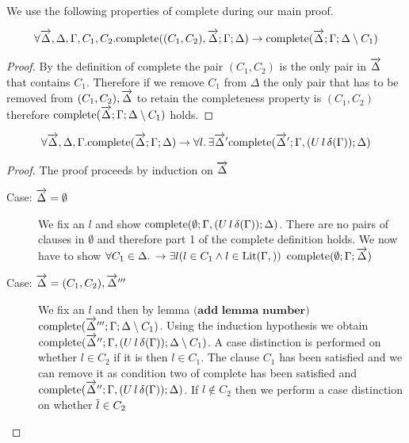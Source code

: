 We use the following properties of $\mathrm{complete}$ during our main proof.


\begin{mylemma}
\begin{align*}
\forall \overrightarrow{\Delta},\Delta,\Gamma,C_1,C_2. \mathrm{complete}((C_1, C_2), \overrightarrow{\Delta};\Gamma; \Delta) \to \mathrm{complete}(\overrightarrow{\Delta};\Gamma; \Delta \setminus C_1)
\end{align*}
\begin{proof}
By the definition of complete the pair $(C_1, C_2)$ is the only pair in $\overrightarrow{\Delta}$ that contains $C_1$.  Therefore if we remove $C_1$ from $\Delta$ the only pair that has to be removed from $(C_1, C_2), \overrightarrow{\Delta}$ to retain the completeness property is $(C_1,C_2)$ therefore $\mathrm{complete}(\overrightarrow{\Delta};\Gamma; \Delta \setminus C_1)$ holds.
\end{proof}
\end{mylemma}

\begin{mylemma}
\begin{align*}\forall \overrightarrow{\Delta},\Delta,\Gamma.  \mathrm{complete}(\overrightarrow{\Delta};\Gamma; \Delta) \to \forall l. \, \exists \overrightarrow{\Delta}' \mathrm{complete}(\overrightarrow{\Delta}';\Gamma, (U \, l \, \delta(\Gamma)); \Delta)
\end{align*}
\begin{proof}
The proof proceeds by induction on $\overrightarrow{\Delta}$
\begin{description}
\item[Case: $\overrightarrow{\Delta} = \emptyset$] 
We fix an $l$ and show $\mathrm{complete}(\emptyset;\Gamma, (U \, l \, \delta(\Gamma)); \Delta)$.  There are no pairs of clauses in $\emptyset$ and therefore part 1 of the $\mathrm{complete}$ definition holds. We now have to show $\forall C_1 \in \Delta. \, \to \exists l (l \in C_1 \wedge l \in \mathrm{Lit}(\Gamma, ))$ $\mathrm{complete}(\emptyset;\Gamma; \overrightarrow{\Delta})$
\item[Case: $\overrightarrow{\Delta} = (C_1, C_2), \overrightarrow{\Delta}'''$] We fix an $l$ and then by lemma $\textbf{(add lemma number)}$ $\mathrm{complete}(\overrightarrow{\Delta}''';\Gamma; \Delta \setminus C_1)$. Using the induction hypothesis we obtain $\mathrm{complete}(\overrightarrow{\Delta}'';\Gamma, (U \, l \, \delta(\Gamma)); \Delta \setminus C_1)$. A case distinction is performed on whether $l \in C_2$ if it is then $l \in C_1$. The clause $C_1$ has been satisfied and we can remove it as condition two of $\mathrm{complete}$ has been satisfied and $\mathrm{complete}(\overrightarrow{\Delta}'';\Gamma, (U \, l \, \delta(\Gamma)); \Delta)$. If $l \notin C_2$ then we perform a case distinction on whether $\overline{l} \in C_2$ 
\end{description}
\end{proof}
\end{mylemma}


